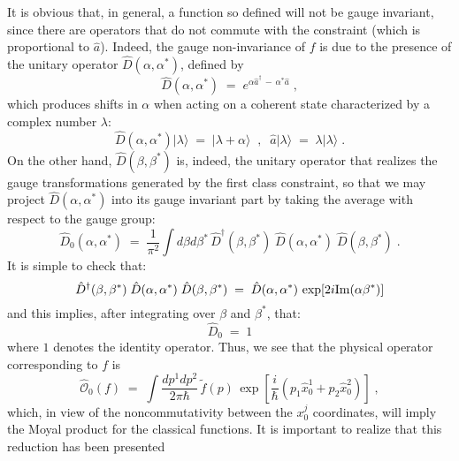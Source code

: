 \documentclass[a4paper,12pt]{article}
\begin{document}
It is obvious that, in general, a function so defined will not be
gauge invariant, since there are operators that do not commute with
the constraint (which is proportional to ${\hat a}$).  Indeed, the
gauge non-invariance of $f$ is due to the presence of the unitary
operator ${\hat D}(\alpha,\alpha^*)$, defined by
\begin{equation}
  \label{defu}
{\hat D}(\alpha,\alpha^*) \;=\; e^{\alpha {\hat a}^\dagger \,-\,
\alpha^* {\hat a}} 
\;,
\end{equation}
which produces shifts in $\alpha$ when acting on a coherent state
characterized by a complex number $\lambda$:
\begin{equation}
  \label{eq:actu}
{\hat D}(\alpha,\alpha^*) |\lambda\rangle \;=\; |\lambda + \alpha
\rangle \;\;,\;\;
{\hat a} |\lambda \rangle \;=\; \lambda |\lambda \rangle \;.
\end{equation}
On the other hand, ${\hat D}(\beta,\beta^*)$ is, indeed, the
unitary operator
that realizes the gauge transformations generated by the first
class
constraint, so that we may project ${\hat D}(\alpha,\alpha^*)$ into
its gauge
invariant part by taking the average with respect to the gauge
group:
\begin{equation}
  \label{eq:gruav}
{\hat D}_0 (\alpha,\alpha^*) \;=\;\frac{1}{\pi^2} \int d\beta
d\beta^* \,
{\hat D}^\dagger (\beta,\beta^*)\;{\hat D}(\alpha,\alpha^*)\;{\hat
D}(\beta,\beta^*)\;. 
\end{equation}
It is simple to check that:
\begin{equation}
  \label{eq:crule}
{\hat D}^\dagger (\beta,\beta^*)\;{\hat D}(\alpha,\alpha^*)\;{\hat
D}(\beta,\beta^*)
\;=\;{\hat D}(\alpha,\alpha^*) \, \exp[2 i {\rm Im}(\alpha
\beta^*)] 
\end{equation}
and this implies, after integrating over $\beta$ and $\beta^*$,
that:
\begin{equation}
  \label{eq:d0}
 {\hat D}_0 \;=\; 1
\end{equation}
where $1$ denotes the identity operator. Thus, we see that the
physical operator corresponding to $f$ is
\begin{equation}
  \label{eq:redf}
{\hat{\mathcal O}}_0(f) \;=\; \int \frac{dp^1 dp^2}{2 \pi \hbar} \,
{\tilde f}(p) \, \exp [ \frac{i}{\hbar} (p_1 {\hat x}^1_0 + p_2
{\hat x}^2_0)] 
\;,
\end{equation}
which, in view of the noncommutativity between the $x^j_0$
coordinates, will imply the Moyal product for the classical
functions.
It is important to realize that this reduction has been presented
\end{document}
